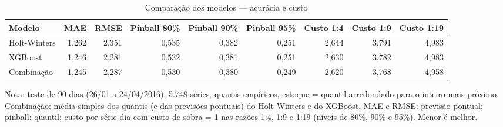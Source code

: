 \begin{table}[htbp]
\centering
\small
\caption{Comparação dos modelos — acurácia e custo}
\label{tab:comp_metricas}
\begin{tabular}{lrrrrrrrr}
\toprule
Modelo & MAE & RMSE & Pinball 80\% & Pinball 90\% & Pinball 95\% & Custo 1:4 & Custo 1:9 & Custo 1:19 \\
\midrule
Holt-Winters & 1,262 & 2,351 & 0,535 & 0,382 & 0,251 & 2,644 & 3,791 & 4,983 \\
XGBoost & 1,246 & 2,281 & 0,532 & 0,381 & 0,251 & 2,630 & 3,782 & 4,983 \\
Combinação & 1,245 & 2,287 & 0,530 & 0,380 & 0,249 & 2,620 & 3,768 & 4,958 \\
\bottomrule
\end{tabular}
\par\smallskip
{\footnotesize Nota: teste de 90 dias (26/01 a 24/04/2016), 5.748 séries, quantis empíricos, estoque = quantil arredondado para o inteiro mais próximo. Combinação: média simples dos quantis (e das previsões pontuais) do Holt-Winters e do XGBoost. MAE e RMSE: previsão pontual; pinball: quantil; custo por série-dia com custo de sobra = 1 nas razões 1:4, 1:9 e 1:19 (níveis de 80\%, 90\% e 95\%). Menor é melhor.}
\end{table}

